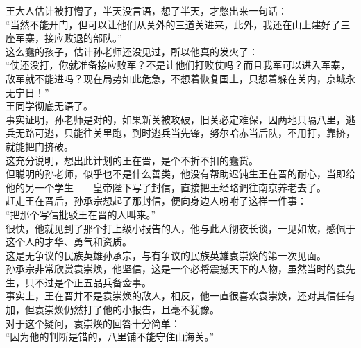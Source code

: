 \begin{multicols}{\theparacolNo}
王大人估计被打懵了，半天没言语，想了半天，才憋出来一句话：\\

“当然不能开门，但可以让他们从关外的三道关进来，此外，我还在山上建好了三座军寨，接应败退的部队。”\\

这么蠢的孩子，估计孙老师还没见过，所以他真的发火了：\\

“仗还没打，你就准备接应败军？不是让他们打败仗吗？而且我军可以进入军寨，敌军就不能进吗？现在局势如此危急，不想着恢复国土，只想着躲在关内，京城永无宁日！”\\

王同学彻底无语了。\\

事实证明，孙老师是对的，如果新关被攻破，旧关必定难保，因两地只隔八里，逃兵无路可逃，只能往关里跑，到时逃兵当先锋，努尔哈赤当后队，不用打，靠挤，就能把门挤破。\\

这充分说明，想出此计划的王在晋，是个不折不扣的蠢货。\\

但聪明的孙老师，似乎也不是什么善类，他没有帮助迟钝生王在晋的耐心，当即给他的另一个学生——皇帝陛下写了封信，直接把王经略调往南京养老去了。\\

赶走王在晋后，孙承宗想起了那封信，便向身边人吩咐了这样一件事：\\

“把那个写信批驳王在晋的人叫来。”\\

很快，他就见到了那个打上级小报告的人，他与此人彻夜长谈，一见如故，感佩于这个人的才华、勇气和资质。\\

这是无争议的民族英雄孙承宗，与有争议的民族英雄袁崇焕的第一次见面。\\

孙承宗非常欣赏袁崇焕，他坚信，这是一个必将震撼天下的人物，虽然当时的袁先生，只不过是个正五品兵备佥事。\\

事实上，王在晋并不是袁崇焕的敌人，相反，他一直很喜欢袁崇焕，还对其信任有加，但袁崇焕仍然打了他的小报告，且毫不犹豫。\\

对于这个疑问，袁崇焕的回答十分简单：\\

“因为他的判断是错的，八里铺不能守住山海关。”\\


\end{multicols}

